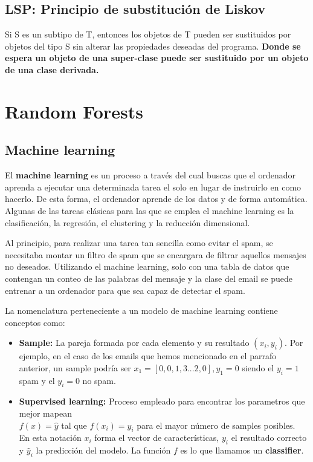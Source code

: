 \documentclass[11pt]{article}
\theoremstyle{plain}
\begin{document}
       \subsection{LSP: Principio de substitución de Liskov} %
        \label{sub:lsp_principio_de_substitucion_de_liskov}
            Si S es un subtipo de T, entonces los objetos de T pueden ser sustituidos por objetos del tipo S sin alterar las propiedades deseadas del programa. \textbf{Donde se espera un objeto de una super-clase puede ser sustituido por un objeto de una clase derivada.}
    \section{Random Forests} %
    \label{sec:random_forests}
        \subsection{Machine learning} %
        \label{sub:machine_learning}
            El \textbf{machine learning} es un proceso a través del cual buscas que el ordenador aprenda a ejecutar una determinada tarea el solo en lugar de instruirlo en como hacerlo. De esta forma, el ordenador aprende de los datos y de forma automática. Algunas de las tareas clásicas para las que se emplea el machine learning es la clasificación, la regresión, el clustering y la reducción dimensional.

            Al principio, para realizar una tarea tan sencilla como evitar el spam, se necesitaba montar un filtro de spam que se encargara de filtrar aquellos mensajes no deseados. Utilizando el machine learning, solo con una tabla de datos que contengan un conteo de las palabras del mensaje y la clase del email se puede entrenar a un ordenador para que sea capaz de detectar el spam.

            La nomenclatura perteneciente a un modelo de machine learning contiene conceptos como:
            \begin{itemize}
                \item \textbf{Sample:} La pareja formada por cada elemento y su resultado $(x_i,y_i)$. Por ejemplo, en el caso de los emails que hemos mencionado en el parrafo anterior, un sample podría ser $x_1 = [0,0,1,3...2,0], y_1 = 0$ siendo el $y_i = 1$ spam y el $y_i = 0$ no spam.
                \item \textbf{Supervised learning:} Proceso empleado para encontrar los parametros que mejor mapean\\ $f(x) = \hat y$ tal que $f(x_i) = y_i$ para el mayor número de samples posibles.\\

                En esta notación $x_i$ forma el vector de características, $y_i$ el resultado correcto y $\hat y_i$ la predicción del modelo. La función $f$ es lo que llamamos un \textbf{classifier}.
            \end{itemize}
\end{document}
